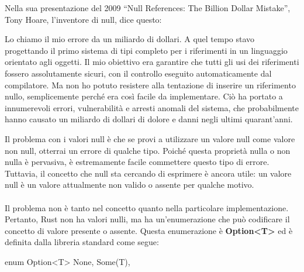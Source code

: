 \documentclass[11pt,a4paper]{article}
\begin{document}
Nella sua presentazione del 2009 “Null References: The Billion Dollar Mistake”, Tony Hoare, l’inventore di null, dice questo:
\begin{mdframed}[hidealllines=true,backgroundcolor=blue!20,innerleftmargin=20pt,innerrightmargin=20pt,leftmargin=-15pt,rightmargin=-15pt]
Lo chiamo il mio errore da un miliardo di dollari. A quel tempo stavo progettando il primo sistema di tipi completo per i riferimenti in un linguaggio orientato agli oggetti. Il mio obiettivo era garantire che tutti gli usi dei riferimenti fossero assolutamente sicuri, con il controllo eseguito automaticamente dal compilatore. Ma non ho potuto resistere alla tentazione di inserire un riferimento nullo, semplicemente perché era così facile da implementare. Ciò ha portato a innumerevoli errori, vulnerabilità e arresti anomali del sistema, che probabilmente hanno causato un miliardo di dollari di dolore e danni negli ultimi quarant’anni.
\end{mdframed}
Il problema con i valori null è che se provi a utilizzare un valore null come valore non null, otterrai un errore di qualche tipo. Poiché questa proprietà nulla o non nulla è pervasiva, è estremamente facile commettere questo tipo di errore.\\
Tuttavia, il concetto che null sta cercando di esprimere è ancora utile: un valore null è un valore attualmente non valido o assente per qualche motivo.\\
\\
Il problema non è tanto nel concetto quanto nella particolare implementazione. Pertanto, Rust non ha valori nulli, ma ha un'enumerazione che può codificare il concetto di valore presente o assente. Questa enumerazione è \textbf{Option<T>} ed è definita dalla libreria standard come segue:
\begin{rust}
enum Option<T> {
    None,
    Some(T),
}
\end{rust}
\end{document}

